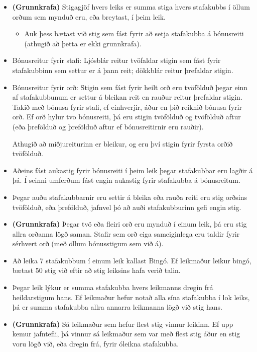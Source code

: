 \documentclass[12pt,a4paper]{article}
\newcommand{\coref}{\textbf{(Grunnkrafa)}}
\begin{document}
\begin{itemize}

	\item \coref{} Stigagjöf hvers leiks er summa stiga hvers stafakubbs í öllum orðum sem mynduð eru, eða breytast, í þeim leik.
	\begin{itemize}
		\item Auk þess bætast við stig sem fást fyrir að setja stafakubba á bónus\-reiti (athugið að þetta er ekki grunnkrafa).
	\end{itemize}

	\item Bónusreitur fyrir stafi: Ljósblár reitur tvöfaldar stigin sem fást fyrir stafakubbinn sem settur er á þann reit; dökkblár reitur þrefaldar stigin.

	\item Bónusreitur fyrir orð: Stigin sem fást fyrir heilt orð eru tvöfölduð þegar einn af stafakubbunum er settur á bleikan reit en rauður reitur þrefaldar stigin. Takið með bónusa fyrir stafi, ef einhverjir, áður en þið reiknið bónusa fyrir orð. Ef orð hylur tvo bónusreiti, þá eru stigin tvöfölduð og tvöfölduð aftur (eða þrefölduð og þrefölduð aftur ef bónus\-reitirnir eru rauðir).

	Athugið að miðjureiturinn er bleikur, og eru því stigin fyrir fyrsta orðið tvöfölduð.

	\item Aðeins fást aukastig fyrir bónusreiti í þeim leik þegar stafakubbar eru lagðir á þá. Í seinni umferðum fást engin aukastig fyrir stafakubba á bónusreitum.

	\item Þegar auðu stafakubbarnir eru settir á bleika eða rauða reiti eru stig orðsins tvöfölduð, eða þrefölduð, jafnvel þó að auði stafakubburinn gefi engin stig.

	\item \coref{} Þegar tvö eða fleiri orð eru mynduð í einum leik, þá eru stig allra orðanna lögð saman. Stafir sem orð eiga sameiginlega eru taldir fyrir sérhvert orð (með öllum bónusstigum sem við á).

	\item Að leika 7 stafakubbum í einum leik kallast Bingó. Ef leikmaður leikur bingó, bætast 50 stig við eftir að stig leiksins hafa verið talin.

	\item Þegar leik lýkur er summa stafakubba hvers leikmanns dregin frá heildarstigum hans. Ef leikmaður hefur notað alla sína stafakubba í lok leiks, þá er summa stafakubba allra annarra leikmanna lögð við stig hans.

	\item \coref{} Sá leikmaður sem hefur flest stig vinnur leikinn. Ef upp kemur jafntefli, þá vinnur sá leikmaður sem var með flest stig áður en stig voru lögð við, eða dregin frá, fyrir óleikna stafakubba.

\end{itemize}
\end{document}
